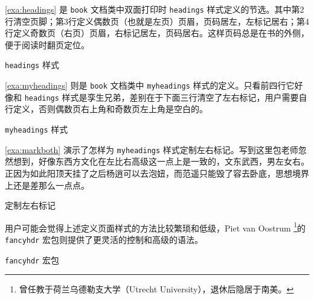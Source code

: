 \autoref{exa:headings} 是 \texttt{book} 文档类中双面打印时 \texttt{headings} 样式定义的节选。其中第2行清空页脚；第3行定义偶数页（也就是左页）页眉，页码居左，左标记居右；第4行定义奇数页（右页）页眉，右标记居左，页码居右。这样页码总是在书的外侧，便于阅读时翻页定位。 

\begin{example}[htbp]
\begin{Code}[]
\def\ps@headings{%
  \let\@oddfoot\@empty\let\@evenfoot\@empty
  \def\@evenhead{\thepage\hfill\slshape\leftmark}%
  \def\@oddhead{{\slshape\rightmark}\hfill\thepage}%
  ...
\end{Code}
\caption{\texttt{headings} 样式}
\label{exa:headings}
\end{example}

\autoref{exa:myheadings} 则是 \texttt{book} 文档类中 \texttt{myheadings} 样式的定义。只看前四行它好像和 \texttt{headings} 样式是孪生兄弟，差别在于下面三行清空了左右标记，用户需要自行定义，否则偶数页右上角和奇数页左上角是空白的。

\begin{example}[htbp]
\begin{Code}[]
\def\ps@myheadings{%
  \let\@oddfoot\@empty\let\@evenfoot\@empty
  \def\@evenhead{\thepage\hfill\slshape\leftmark}%
  \def\@oddhead{{\slshape\rightmark}\hfill\thepage}%
  \let\@mkboth\@gobbletwo
  \let\chaptermark\@gobble
  \let\sectionmark\@gobble
}
\end{Code}
\caption{\texttt{myheadings} 样式}
\label{exa:myheadings}
\end{example}

\autoref{exa:markboth} 演示了怎样为 \texttt{myheadings} 样式定制左右标记。写到这里包老师忽然想到，好像东西方文化在左比右高级这一点上是一致的，文东武西，男左女右。正因为如此阳顶天挂了之后杨逍可以去泡妞，而范遥只能毁了容去卧底，思想境界上还是差那么一点点。

\begin{example}[htbp]
\caption{定制左右标记}
\label{exa:markboth}
\end{example}

用户可能会觉得上述定义页面样式的方法比较繁琐和低级，Piet van Oostrum\indexOostrum{} \footnote{曾任教于荷兰乌德勒支大学（Utrecht University），退休后隐居于南美。}的 \texttt{fancyhdr} 宏包\citep{Oostrum_fancyhdr}则提供了更灵活的控制和高级的语法。

\begin{example}[htbp]
\caption{\texttt{fancyhdr} 宏包}
\label{exa:fancyhdr}
\end{example}

